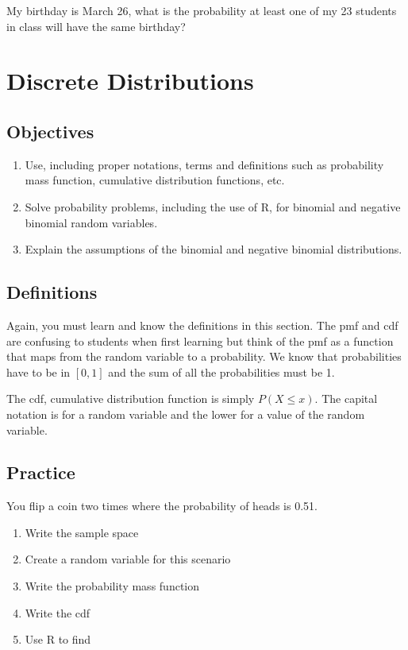 \documentclass[]{book}
\providecommand{\tightlist}{%
  \setlength{\itemsep}{0pt}\setlength{\parskip}{0pt}}
\theoremstyle{definition}
\theoremstyle{definition}
\theoremstyle{definition}
\theoremstyle{remark}
\begin{document}
My birthday is March 26, what is the probability at least one of my 23
students in class will have the same birthday?

\hypertarget{L7}{\section{Discrete Distributions}\label{L7}}

\subsection{Objectives}\label{objectives-6}

\begin{enumerate}
\def\labelenumi{\arabic{enumi}.}
\tightlist
\item
  Use, including proper notations, terms and definitions such as
  probability mass function, cumulative distribution functions, etc.\\
\item
  Solve probability problems, including the use of R, for binomial and
  negative binomial random variables.\\
\item
  Explain the assumptions of the binomial and negative binomial
  distributions.
\end{enumerate}

\subsection{Definitions}\label{definitions-1}

Again, you must learn and know the definitions in this section. The pmf
and cdf are confusing to students when first learning but think of the
pmf as a function that maps from the random variable to a probability.
We know that probabilities have to be in \([0,1]\) and the sum of all
the probabilities must be 1.

The cdf, cumulative distribution function is simply \(P(X \leq x)\). The
capital notation is for a random variable and the lower for a value of
the random variable.

\subsection{Practice}\label{practice}

You flip a coin two times where the probability of heads is 0.51.

\begin{enumerate}
\def\labelenumi{\arabic{enumi}.}
\tightlist
\item
  Write the sample space\\
\item
  Create a random variable for this scenario\\
\item
  Write the probability mass function
\item
  Write the cdf\\
\item
  Use R to find\\
\end{enumerate}
\end{document}
